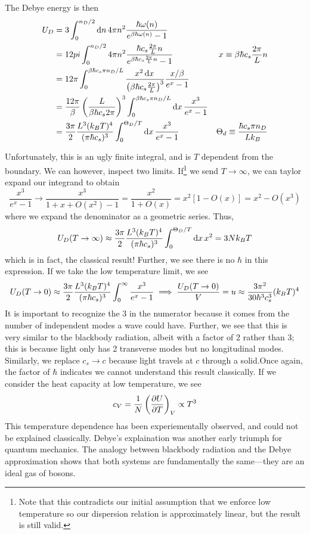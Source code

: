 The Debye energy is then
\begin{align*}
	U_{D} &= 3\int_0^{n_D/2}\d{n}4\pi n^2 \frac{\hbar\omega(n)}{e^{\beta\hbar\omega(n)}-1}\\
	      &=12pi\int_0^{n_D/2}4\pi n^2 \frac{\hbar c_s\frac{2\pi}{L}n}{e^{\beta\hbar c_s \frac{2\pi}{L}n}-1}&x\equiv \beta\hbar c_s \frac{2\pi}{L}n\\
	      &=12\pi\int_0^{\beta\hbar c_s\pi n_D/L}\frac{x^2\d{x}}{\left(\beta\hbar c_s \frac{2\pi}{L}\right)^3}\frac{x/\beta}{e^x-1}\\
	      &=\frac{12\pi}{\beta}\left(\frac{L}{\beta\hbar c_s 2\pi}\right)^3\int_0^{\beta\hbar c_s \pi n_D/L}\d{x}\frac{x^3}{e^x-1}\\
	      &=\frac{3\pi}{2}\frac{L^3(k_BT)^4}{(\pi\hbar c_s)^3}\int_0^{\Theta_D/T}\d{x}\frac{x^3}{e^x-1} & \Theta_d\equiv\frac{\hbar c_s\pi n_D}{Lk_B}
\end{align*}

Unfortunately, this is an ugly finite integral, and is \(T\) dependent from the boundary. We can however, inspect two limits. If\footnote{Note that this contradicts our initial assumption that we enforce low temperature so our dispersion relation is approximately linear, but the result is still valid.} we send \(T\to\infty\), we can taylor expand our integrand to obtain
\[\frac{x^3}{e^x-1}\to\frac{x^3}{1+x+O(x^2)-1} = \frac{x^2}{1+O(x)}=x^2[1-O(x)]=x^2-O(x^3)\]
where we expand the denominator as a geometric series. Thus,
\[U_D(T\to\infty)\approx \frac{3\pi}{2}\frac{L^3(k_BT)^4}{(\pi\hbar c_s)^3}\int_0^{\Theta_D/T}\d{x}x^2= 3Nk_BT\]
which is in fact, the classical result! Further, we see there is no \(\hbar\) in this expression. If we take the low temperature limit, we see
\[U_D(T\rightarrow 0) \approx \frac{3\pi}{2}\frac{L^3(k_BT)^4}{(\pi\hbar c_s)^3}\int_0^\infty \frac{x^3}{e^x-1}\implies \frac{U_D(T\rightarrow 0)}{V} =u \approx \frac{3\pi^2}{30\hbar^3c_s^3}(k_BT)^4\]
It is important to recognize the 3 in the numerator because it comes from the number of independent modes a wave could have. Further, we see that this is very similar to the blackbody radiation, albeit with a factor of 2 rather than 3; this is because light only has 2 transverse modes but no longitudinal modes. Similarly, we replace \(c_s\to c\) because light travels at \(c\) through a solid.Once again, the factor of \(\hbar\) indicates we cannot understand this result classically. If we consider the heat capacity at low temperature, we see
\[c_V = \frac{1}{N}\left(\frac{\partial U}{\partial T}\right)_V\propto T^3\]
This temperature dependence has been experiementally observed, and could not be explained classically. Debye's explaination was another early triumph for quantum mechanics. The analogy between blackbody radiation and the Debye approximation shows that both systems are fundamentally the same---they are an ideal gas of bosons.
